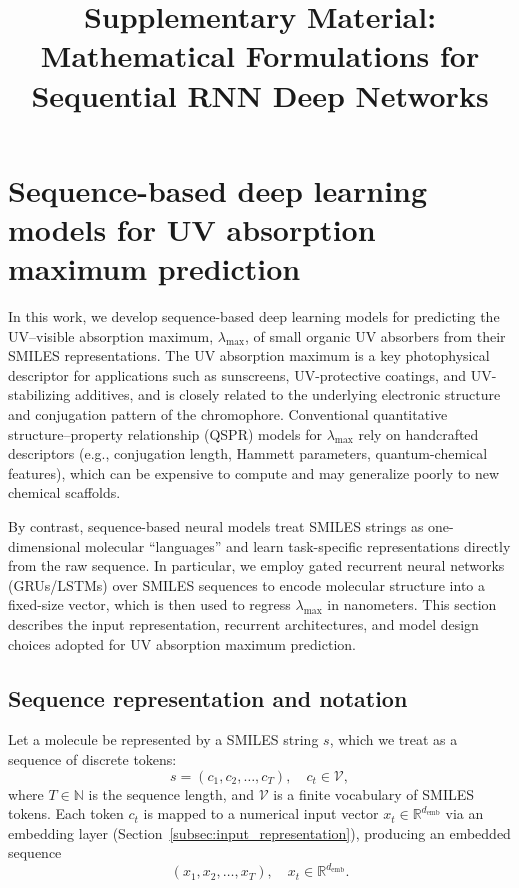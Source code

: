 \documentclass[11pt,a4paper]{article}
\title{Supplementary Material: Mathematical Formulations for Sequential RNN Deep Networks}
\author{}
\date{}
\begin{document}
\maketitle

\section{Sequence-based deep learning models for UV absorption maximum prediction}
\label{sec:seq_uv_models}

In this work, we develop sequence-based deep learning models for predicting the UV--visible absorption maximum, $\lambda_{\max}$, of small organic UV absorbers from their SMILES representations. The UV absorption maximum is a key photophysical descriptor for applications such as sunscreens, UV-protective coatings, and UV-stabilizing additives, and is closely related to the underlying electronic structure and conjugation pattern of the chromophore. Conventional quantitative structure--property relationship (QSPR) models for $\lambda_{\max}$ rely on handcrafted descriptors (e.g., conjugation length, Hammett parameters, quantum-chemical features), which can be expensive to compute and may generalize poorly to new chemical scaffolds.

By contrast, sequence-based neural models treat SMILES strings as one-dimensional molecular ``languages'' and learn task-specific representations directly from the raw sequence. In particular, we employ gated recurrent neural networks (GRUs/LSTMs) over SMILES sequences to encode molecular structure into a fixed-size vector, which is then used to regress $\lambda_{\max}$ in nanometers. This section describes the input representation, recurrent architectures, and model design choices adopted for UV absorption maximum prediction.

\subsection{Sequence representation and notation}
\label{subsec:notation}

Let a molecule be represented by a SMILES string $s$, which we treat as a sequence of discrete tokens:
\begin{equation}
  s = (c_1, c_2, \dots, c_T), \quad c_t \in \mathcal{V},
\end{equation}
where $T \in \mathbb{N}$ is the sequence length, and $\mathcal{V}$ is a finite vocabulary of SMILES tokens. Each token $c_t$ is mapped to a numerical input vector $x_t \in \mathbb{R}^{d_{\mathrm{emb}}}$ via an embedding layer (Section~\ref{subsec:input_representation}), producing an embedded sequence
\begin{equation}
  (x_1, x_2, \dots, x_T), \quad x_t \in \mathbb{R}^{d_{\mathrm{emb}}}.
\end{equation}
\end{document}
